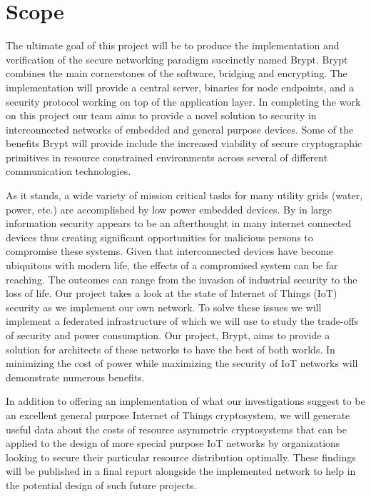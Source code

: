 \documentclass[tikz,a4paper,titlepage]{article}
\begin{document}
\section{Scope}

The ultimate goal of this project will be to produce the implementation and verification of the secure networking paradigm succinctly named Brypt. Brypt combines the main cornerstones of the software, bridging and encrypting. The implementation will provide a central server, binaries for node endpoints, and a security protocol working on top of the application layer. In completing the work on this project our team aims to provide a novel solution to security in interconnected networks of embedded and general purpose devices. Some of the benefits Brypt will provide include the increased viability of secure cryptographic primitives in resource constrained environments across several of different communication technologies.

As it stands, a wide variety of mission critical tasks for many utility grids (water, power, etc.) are accomplished by low power embedded devices. By in large information security appears to be an afterthought in many internet connected devices thus creating significant opportunities for malicious persons to compromise these systems. Given that interconnected devices have become ubiquitous with modern life, the effects of a compromised system can be far reaching. The outcomes can range from the invasion of industrial security to the loss of life. Our project takes a look at the state of Internet of Things (IoT) security as we implement our own network. To solve these issues we will implement a federated infrastructure of which we will use to study the trade-offs of security and power consumption. Our project, Brypt, aims to provide a solution for architects of these networks to have the best of both worlds. In minimizing the cost of power while maximizing the security of IoT networks will demonstrate numerous benefits.

In addition to offering an implementation of what our investigations suggest to be an excellent general purpose Internet of Things cryptosystem, we will generate useful data about the costs of resource asymmetric cryptosystems that can be applied to the design of more special purpose IoT networks by organizations looking to secure their particular resource distribution optimally. These findings will be published in a final report alongside the implemented network to help in the potential design of such future projects.
\end{document}
